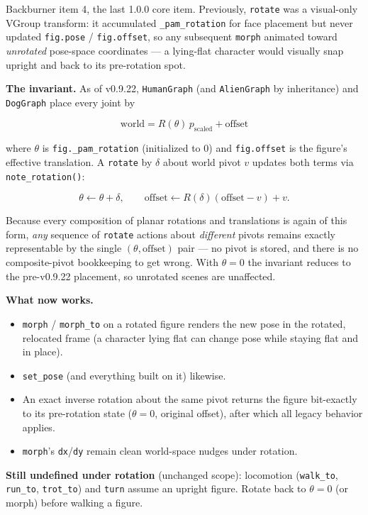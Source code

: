 \documentclass[
  11pt,
]{book}
\begin{document}
Backburner item 4, the last 1.0.0 core item. Previously,
\texttt{rotate} was a visual-only VGroup transform: it accumulated
\texttt{\_pam\_rotation} for face placement but never updated
\texttt{fig.pose} / \texttt{fig.offset}, so any subsequent
\texttt{morph} animated toward \emph{unrotated} pose-space
coordinates --- a lying-flat character would visually snap upright
and back to its pre-rotation spot.

\textbf{The invariant.} As of v0.9.22, \texttt{HumanGraph} (and
\texttt{AlienGraph} by inheritance) and \texttt{DogGraph} place every
joint by

\[ \mathrm{world} = R(\theta)\, p_{\mathrm{scaled}} + \mathrm{offset} \]

where $\theta$ is \texttt{fig.\_pam\_rotation} (initialized to $0$)
and \texttt{fig.offset} is the figure's effective translation. A
\texttt{rotate} by $\delta$ about world pivot $v$ updates both terms
via \texttt{note\_rotation()}:

\[ \theta \leftarrow \theta + \delta, \qquad
\mathrm{offset} \leftarrow R(\delta)(\mathrm{offset} - v) + v . \]

Because every composition of planar rotations and translations is
again of this form, \emph{any} sequence of \texttt{rotate} actions
about \emph{different} pivots remains exactly representable by the
single $(\theta, \mathrm{offset})$ pair --- no pivot is stored, and
there is no composite-pivot bookkeeping to get wrong. With
$\theta = 0$ the invariant reduces to the pre-v0.9.22 placement, so
unrotated scenes are unaffected.

\textbf{What now works.}

\begin{itemize}
\item
  \texttt{morph} / \texttt{morph\_to} on a rotated figure renders the
  new pose in the rotated, relocated frame (a character lying flat
  can change pose while staying flat and in place).
\item
  \texttt{set\_pose} (and everything built on it) likewise.
\item
  An exact inverse rotation about the same pivot returns the figure
  bit-exactly to its pre-rotation state ($\theta = 0$, original
  offset), after which all legacy behavior applies.
\item
  \texttt{morph}'s \texttt{dx}/\texttt{dy} remain clean world-space
  nudges under rotation.
\end{itemize}

\textbf{Still undefined under rotation} (unchanged scope):
locomotion (\texttt{walk\_to}, \texttt{run\_to}, \texttt{trot\_to})
and \texttt{turn} assume an upright figure. Rotate back to
$\theta = 0$ (or morph) before walking a figure.
\end{document}

